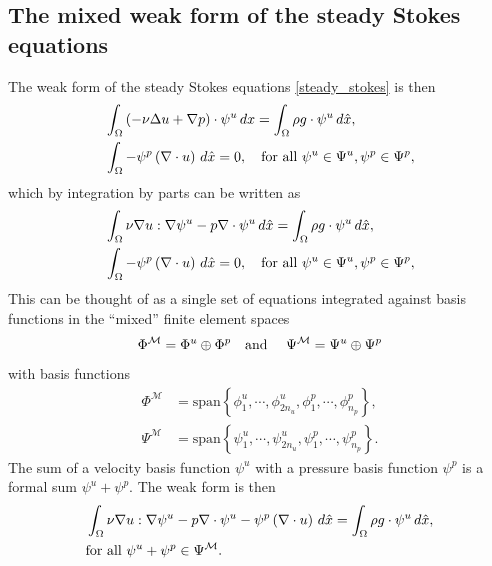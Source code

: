 \subsection{The mixed weak form of the steady Stokes equations}
The weak form of the steady Stokes equations \eqref{steady_stokes} is then
\begin{equation*}
\begin{split}
    &\int_{\Omega} \left(-\nu\Delta u + \nabla p\right)\cdot \psi^u\,dx = \int_\Omega \rho g\cdot\psi^u\,d\hat{x},\\
    &\int_{\Omega} -\psi^p\left(\nabla\cdot u\right)\,d\hat{x} = 0, \quad\text{for all $\psi^u \in \Psi^u, \psi^p \in \Psi^p$},
\end{split}
\end{equation*}
which by integration by parts can be written as
\begin{equation}\label{steady_stokes_weak}
\begin{split}
    &\int_{\Omega} \nu\nabla u : \nabla \psi^u - p\nabla\cdot \psi^u\,d\hat{x} = \int_{\Omega} \rho g \cdot \psi^u\,d\hat{x},\\
    &\int_{\Omega} -\psi^p\left(\nabla\cdot u\right)\,d\hat{x} = 0, \quad\text{for all $\psi^u \in \Psi^u, \psi^p \in \Psi^p$},
\end{split}
\end{equation}
This can be thought of as a single set of equations integrated against basis functions in the ``mixed'' finite element spaces
    $$\Phi^\mathcal{M} = \Phi^u \oplus \Phi^p \text{\quad and \quad} \Psi^\mathcal{M} = \Psi^u \oplus \Psi^p$$
with basis functions
\begin{equation}\label{mixed_space_basis_functions}
\begin{split}
    \Phi^\mathcal{M} &= \text{span}\left\{
        \phi^u_1,\cdots,\phi^u_{2n_u}, \phi_1^p,\cdots,\phi_{n_p}^p
    \right\},\\
    \Psi^\mathcal{M} &= \text{span}\left\{
        \psi^u_1,\cdots,\psi^u_{2n_u}, \psi_1^p,\cdots,\psi_{n_p}^p
    \right\}.
\end{split}
\end{equation}
The sum of a velocity basis function $\psi^u$ with a pressure basis function $\psi^p$ is a formal sum $\psi^u + \psi^p$. The weak form is then
\begin{equation}\label{steady_stokes_weak_mixed}
\begin{split}
    &\int_{\Omega} \nu\nabla u : \nabla \psi^u - p\nabla\cdot \psi^u
    -\psi^p\left(\nabla\cdot u\right)\,d\hat{x}
 = \int_{\Omega} \rho g \cdot \psi^u\,d\hat{x},\\
    &\text{for all $\psi^u + \psi^p \in \Psi^\mathcal{M}$}.
\end{split}
\end{equation}

